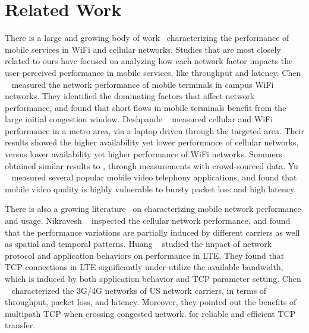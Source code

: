 
\section{Related Work}
\label{sec:related}

There is a large and growing body of work~\cite{chen2012network,deshpande2010performance,sommers2012cell,sharma2010goodput,yu2014can} characterizing the performance of mobile services in WiFi and cellular networks. Studies that are most closely related to ours have focused on analyzing how each network factor impacts the user-perceived performance in mobile services, like throughput and latency. Chen \etal~\cite{chen2012network} measured the network performance of mobile terminals in campus WiFi networks. They identified the dominating factors that affect network performance, and found that short flows in mobile terminals benefit from the large initial congestion window. Deshpande \etal~\cite{deshpande2010performance} measured cellular and WiFi performance in a metro area, via a laptop driven through the targeted area. Their results showed the higher availability yet lower performance of cellular networks, versus lower availability yet higher performance of WiFi networks. Sommers \etal~\cite{sommers2012cell} obtained similar results to \cite{deshpande2010performance}, through measurements with crowd-sourced data. Yu \etal~\cite{yu2014can} measured several popular mobile video telephony applications, and found that mobile video quality is highly vulnerable to bursty packet loss and high latency. 

There is also a growing literature~\cite{nikravesh2014mobile,deng2014wifi,huang2013depth,UM-CS-2012-022} on characterizing mobile network performance and usage. Nikravesh \etal~\cite{nikravesh2014mobile} inspected the cellular network performance, and found that the performance variations are partially induced by different carriers as well as spatial and temporal patterns. Huang \etal~\cite{huang2013depth} studied the impact of network protocol and application behaviors on performance in LTE. They found that TCP connections in LTE significantly under-utilize the available bandwidth, which is induced by both application behavior and TCP parameter setting. Chen \etal~\cite{UM-CS-2012-022} characterized the 3G/4G networks of US network carriers, in terms of throughput, packet loss, and latency. Moreover, they pointed out the benefits of multipath TCP when crossing congested network, for reliable and efficient TCP transfer.

